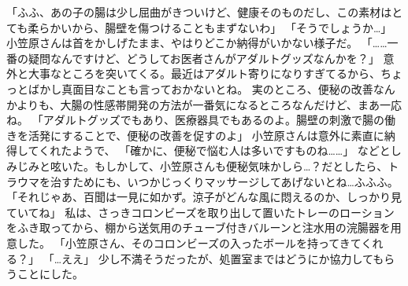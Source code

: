 「ふふ、あの子の腸は少し屈曲がきついけど、健康そのものだし、この素材はとても柔らかいから、腸壁を傷つけることもまずないわ」
「そうでしょうか…」
小笠原さんは首をかしげたまま、やはりどこか納得がいかない様子だ。
「……一番の疑問なんですけど、どうしてお医者さんがアダルトグッズなんかを？」
意外と大事なところを突いてくる。最近はアダルト寄りになりすぎてるから、ちょっとばかし真面目なことも言っておかないとね。
実のところ、便秘の改善なんかよりも、大腸の性感帯開発の方法が一番気になるところなんだけど、まあ一応ね。
「アダルトグッズでもあり、医療器具でもあるのよ。腸壁の刺激で腸の働きを活発にすることで、便秘の改善を促すのよ」
小笠原さんは意外に素直に納得してくれたようで、
「確かに、便秘で悩む人は多いですものね……」
などとしみじみと呟いた。もしかして、小笠原さんも便秘気味かしら…？だとしたら、トラウマを治すためにも、いつかじっくりマッサージしてあげないとね…ふふふ。
「それじゃあ、百聞は一見に如かず。涼子がどんな風に悶えるのか、しっかり見ていてね」
私は、さっきコロンビーズを取り出して置いたトレーのローションをふき取ってから、棚から送気用のチューブ付きバルーンと注水用の浣腸器を用意した。
「小笠原さん、そのコロンビーズの入ったボールを持ってきてくれる？」
「…ええ」
少し不満そうだったが、処置室まではどうにか協力してもらうことにした。


